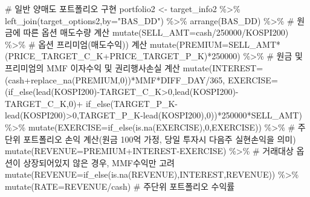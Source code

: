 \documentclass[
  a4paper,
  DIV=11,
  numbers=noendperiod]{scrreprt}
\newenvironment{Shaded}{\begin{snugshade}}{\end{snugshade}}
\newcommand{\AttributeTok}[1]{\textcolor[rgb]{0.40,0.45,0.13}{#1}}
\newcommand{\CommentTok}[1]{\textcolor[rgb]{0.37,0.37,0.37}{#1}}
\newcommand{\DecValTok}[1]{\textcolor[rgb]{0.68,0.00,0.00}{#1}}
\newcommand{\FunctionTok}[1]{\textcolor[rgb]{0.28,0.35,0.67}{#1}}
\newcommand{\NormalTok}[1]{\textcolor[rgb]{0.00,0.23,0.31}{#1}}
\newcommand{\OtherTok}[1]{\textcolor[rgb]{0.00,0.23,0.31}{#1}}
\newcommand{\SpecialCharTok}[1]{\textcolor[rgb]{0.37,0.37,0.37}{#1}}
\newcommand{\StringTok}[1]{\textcolor[rgb]{0.13,0.47,0.30}{#1}}
\begin{document}
\begin{Shaded}
\begin{Highlighting}[]
\CommentTok{\# 일반 양매도 포트폴리오 구현}
\NormalTok{portfolio2 }\OtherTok{\textless{}{-}}\NormalTok{ target\_info2 }\SpecialCharTok{\%\textgreater{}\%} 
  \FunctionTok{left\_join}\NormalTok{(target\_options2,}\AttributeTok{by=}\StringTok{"BAS\_DD"}\NormalTok{) }\SpecialCharTok{\%\textgreater{}\%} 
  \FunctionTok{arrange}\NormalTok{(BAS\_DD) }\SpecialCharTok{\%\textgreater{}\%} 
  \CommentTok{\# 원금에 따른 옵션 매도수량 계산}
  \FunctionTok{mutate}\NormalTok{(}\AttributeTok{SELL\_AMT=}\NormalTok{cash}\SpecialCharTok{/}\DecValTok{250000}\SpecialCharTok{/}\NormalTok{KOSPI200) }\SpecialCharTok{\%\textgreater{}\%} 
  \CommentTok{\# 옵션 프리미엄(매도수익)) 계산}
  \FunctionTok{mutate}\NormalTok{(}\AttributeTok{PREMIUM=}\NormalTok{SELL\_AMT}\SpecialCharTok{*}\NormalTok{(PRICE\_TARGET\_C\_K}\SpecialCharTok{+}\NormalTok{PRICE\_TARGET\_P\_K)}\SpecialCharTok{*}\DecValTok{250000}\NormalTok{) }\SpecialCharTok{\%\textgreater{}\%} 
  \CommentTok{\# 원금 및 프리미엄의 MMF 이자수익 및 권리행사손실 계산}
  \FunctionTok{mutate}\NormalTok{(}\AttributeTok{INTEREST=}\NormalTok{(cash}\SpecialCharTok{+}\FunctionTok{replace\_na}\NormalTok{(PREMIUM,}\DecValTok{0}\NormalTok{))}\SpecialCharTok{*}\NormalTok{MMF}\SpecialCharTok{*}\NormalTok{DIFF\_DAY}\SpecialCharTok{/}\DecValTok{365}\NormalTok{,}
         \AttributeTok{EXERCISE=}\NormalTok{(}\FunctionTok{if\_else}\NormalTok{(}\FunctionTok{lead}\NormalTok{(KOSPI200)}\SpecialCharTok{{-}}\NormalTok{TARGET\_C\_K}\SpecialCharTok{\textgreater{}}\DecValTok{0}\NormalTok{,}\FunctionTok{lead}\NormalTok{(KOSPI200)}\SpecialCharTok{{-}}\NormalTok{TARGET\_C\_K,}\DecValTok{0}\NormalTok{)}\SpecialCharTok{+}
                     \FunctionTok{if\_else}\NormalTok{(TARGET\_P\_K}\SpecialCharTok{{-}}\FunctionTok{lead}\NormalTok{(KOSPI200)}\SpecialCharTok{\textgreater{}}\DecValTok{0}\NormalTok{,TARGET\_P\_K}\SpecialCharTok{{-}}\FunctionTok{lead}\NormalTok{(KOSPI200),}\DecValTok{0}\NormalTok{))}\SpecialCharTok{*}\DecValTok{250000}\SpecialCharTok{*}\NormalTok{SELL\_AMT) }\SpecialCharTok{\%\textgreater{}\%} 
  \FunctionTok{mutate}\NormalTok{(}\AttributeTok{EXERCISE=}\FunctionTok{if\_else}\NormalTok{(}\FunctionTok{is.na}\NormalTok{(EXERCISE),}\DecValTok{0}\NormalTok{,EXERCISE)) }\SpecialCharTok{\%\textgreater{}\%} 
  \CommentTok{\# 주단위 포트폴리오 손익 계산(원금 100억 가정, 당일 투자시 다음주 실현손익을 의미)}
  \FunctionTok{mutate}\NormalTok{(}\AttributeTok{REVENUE=}\NormalTok{PREMIUM}\SpecialCharTok{+}\NormalTok{INTEREST}\SpecialCharTok{{-}}\NormalTok{EXERCISE) }\SpecialCharTok{\%\textgreater{}\%} 
  \CommentTok{\# 거래대상 옵션이 상장되어있지 않은 경우, MMF수익만 고려}
  \FunctionTok{mutate}\NormalTok{(}\AttributeTok{REVENUE=}\FunctionTok{if\_else}\NormalTok{(}\FunctionTok{is.na}\NormalTok{(REVENUE),INTEREST,REVENUE)) }\SpecialCharTok{\%\textgreater{}\%} 
  \FunctionTok{mutate}\NormalTok{(}\AttributeTok{RATE=}\NormalTok{REVENUE}\SpecialCharTok{/}\NormalTok{cash) }\CommentTok{\# 주단위 포트폴리오 수익률}


\end{Highlighting}
\end{Shaded}
\end{document}
